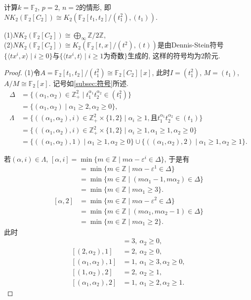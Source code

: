 计算$k=\mathbb{F}_2$, $p=2$, $n=2$的情形, 即$NK_2(\mathbb{F}_2[C_2])\cong K_2(\mathbb{F}_2[t_1, t_2]/(t_1^2), (t_1))$. 
\begin{theorem}
	(1)$NK_2(\mathbb{F}_2[C_2])\cong \bigoplus_{\infty} \mathbb{Z}/2 \mathbb{Z}$, \\
	(2)$NK_2(\mathbb{F}_2[C_2])\cong K_2(\mathbb{F}_2[t, x]/(t^2), (t))$是由Dennis-Stein符号$\{\langle tx^i, x \rangle \mid i\geq 0\}$与$\{\langle tx^i, t \rangle \mid i\geq 1\text{为奇数}\}$生成的, 这样的符号均为$2$阶元. 
\end{theorem}
\begin{proof}
	(1)令$A=\mathbb{F}_2[t_1, t_2]/(t_1^2) \cong \mathbb{F}_2[C_{2}][x]$, 此时$I=(t_1^2)$, $M=(t_1)$, $A/M \cong \mathbb{F}_2[x]$. 记号如\ref{subsec:符号}所述.
\begin{align*}
\Delta &=\{(\alpha_1, \alpha_2)\in\mathbb{Z}_+^2\mid  t_1^{\alpha_1}t_2^{\alpha_2}\in (t_1^2)\}\\
	&=\{(\alpha_1, \alpha_2)\mid \alpha_1\geq 2, \alpha_2 \geq 0\}, \\
\Lambda &=\{((\alpha_1, \alpha_2), i)\in\mathbb{Z}_+^2 \times \{1, 2\}\mid \alpha_i\geq 1, \text{且} t_1^{\alpha_1}t_2^{\alpha_2}\in (t_1)\} \\
	&=\{((\alpha_1, \alpha_2), i)\in\mathbb{Z}_+^2 \times \{1, 2\}\mid \alpha_i\geq 1, \alpha_1\geq 1, \alpha_2\geq 0\} \\
	&=\{((\alpha_1, \alpha_2), 1) \mid \alpha_1\geq 1, \alpha_2\geq 0\}\cup \{((\alpha_1, \alpha_2), 2) \mid \alpha_1\geq 1, \alpha_2\geq 1\}. 
\end{align*}

若$(\alpha, i)\in \Lambda$, $[\alpha, i] = \min \{m\in \mathbb{Z}\mid m \alpha -\varepsilon^i \in \Delta\}$, 于是有
\begin{align*}
[\alpha, 1] & = \min \{m\in \mathbb{Z} \mid m \alpha -\varepsilon^1 \in \Delta\} \\
& =\min \{m\in \mathbb{Z} \mid (m \alpha_1-1, m \alpha_2)\in \Delta\} \\
& =\min \{m\in \mathbb{Z} \mid m \alpha_1\geq 3\}. \\
[\alpha, 2] & = \min \{m\in \mathbb{Z} \mid m \alpha -\varepsilon^2 \in \Delta\} \\
& =\min \{m\in \mathbb{Z} \mid (m \alpha_1, m \alpha_2-1)\in \Delta\} \\
& =\min \{m\in \mathbb{Z} \mid m \alpha_1\geq 2\}. 
\end{align*}
此时
\begin{align*}
[(1, \alpha_2), 1] & = 3, \ \alpha_2\geq 0, \\
[(2, \alpha_2), 1] & = 2, \ \alpha_2\geq 0, \\
[(\alpha_1, \alpha_2), 1] & = 1, \ \alpha_1\geq 3, \alpha_2\geq 0, \\
[(1, \alpha_2), 2] & = 2, \ \alpha_2\geq 1, \\
[(\alpha_1, \alpha_2), 2] & = 1, \ \alpha_1\geq 2, \alpha_2\geq 1. 
\end{align*}




\end{proof}
